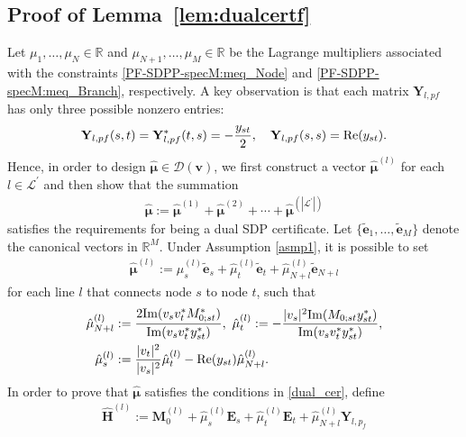 \documentclass[journal,twoside]{IEEEtran}
\newcommand{\re}{{\rm Re}}
\newcommand{\bY}{\mathbf{Y}}
\newcommand{\cL}{{\mathcal L}}
\begin{document}
\subsection{Proof of Lemma~\ref{lem:dualcertf}}\label{appendix:dualcertf}
Let $\mu_1,\ldots,\mu_N\in\mathbb{R}$ and $\mu_{N+1},\ldots,\mu_{M}\in\mathbb{R}$ be the Lagrange multipliers associated with the constraints
\eqref{PF-SDPP-specM:meq_Node} and \eqref{PF-SDPP-specM:meq_Branch}, respectively.
A key observation is that each matrix $\bY_{l,pf}$ has only three possible nonzero entries:
\begin{align*}
\bY_{l,pf}(s,t) = \bY_{l,pf}^{\ast}(t,s) =  -\frac{y_{st}}{2},\quad \bY_{l,pf}(s,s) = \re(y_{st}).
\end{align*}
Hence, in order to design  $\hat{\boldsymbol{\mu}}\in\mathcal{D}(\mathbf{v})$, we first construct a vector $\hat{\boldsymbol{\mu}}^{(l)}$ for each $l\in\cL^{\prime}$ and then  show that the summation
\begin{align}
\hat{\boldsymbol{\mu}}:= \hat{\boldsymbol{\mu}}^{(1)}+\hat{\boldsymbol{\mu}}^{(2)}+\cdots+\hat{\boldsymbol{\mu}}^{(|\cL^{\prime}|)}
\end{align}
satisfies the requirements for being a dual SDP certificate.
Let $\{\tilde{\mathbf{e}}_1,\ldots,\tilde{\mathbf{e}}_{M}\}$ denote the canonical vectors in $\mathbb{R}^{M}$.
Under Assumption \ref{asmp1}, it is possible to set
\begin{align}
\hat{\boldsymbol{\mu}}^{(l)}\!:=\hat{\mu}^{(l)}_s \tilde{\mathbf{e}}_s + \hat{\mu}^{(l)}_t\tilde{\mathbf{e}}_t + \hat{\mu}^{(l)}_{N+l}\tilde{\mathbf{e}}_{N+l}
\end{align}
for each line $l$ that connects node $s$ to node $t$, such that
\begin{align}
\hat{\mu}^{(l)}_{N+l} &:= \frac{2\mathrm{Im}(v_s v^{\ast}_t M^{\ast}_{0;st})}{\mathrm{Im}(v_s v^{\ast}_t y^{\ast}_{st})},\,\,
\hat{\mu}^{(l)}_t := -\frac{|v_s|^2\mathrm{Im}(M_{0;st}y^{\ast}_{st})}{\mathrm{Im}(v_s v^{\ast}_t y^{\ast}_{st})}, \notag \\
\hat{\mu}^{(l)}_s &:= \frac{|v_t|^2}{|v_s|^2}\hat{\mu}^{(l)}_t-\mathrm{Re}(y_{st})\hat{\mu}^{(l)}_{N+l}.
\label{eq:mul}
\end{align}
In order to prove that $\hat{\boldsymbol{\mu}}$ satisfies the conditions in \eqref{dual_cer}, define
\begin{align}
\widehat{\mathbf{H}}^{(l)}:=\mathbf{M}^{(l)}_0+\hat{\mu}^{(l)}_s\mathbf{E}_s+\hat{\mu}^{(l)}_t\mathbf{E}_t+\hat{\mu}^{(l)}_{N+l}\mathbf{Y}_{l,p_f}
\end{align}
\end{document}
